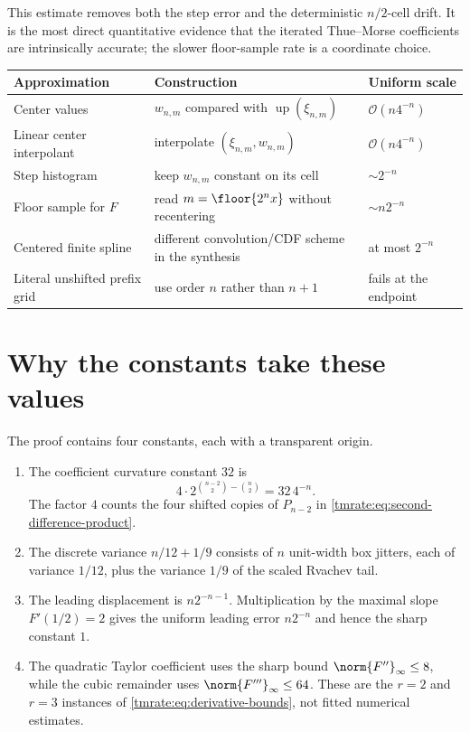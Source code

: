 \documentclass[11pt,oneside]{article}
\theoremstyle{definition}
\theoremstyle{remark}
\newcommand{\Up}{\operatorname{up}}
\newcommand{\bigO}{\mathcal O}
\begin{document}
This estimate removes both the step error and the deterministic $n/2$-cell
drift.  It is the most direct quantitative evidence that the iterated
Thue--Morse coefficients are intrinsically accurate; the slower floor-sample
rate is a coordinate choice.

\begin{center}
\begin{tabularx}{0.96\textwidth}{@{}l>{\raggedright\arraybackslash}Xl@{}}
\toprule
Approximation & Construction & Uniform scale\\
\midrule
Center values & $w_{n,m}$ compared with $\Up(\xi_{n,m})$ & $\bigO(n4^{-n})$\\
Linear center interpolant & interpolate $(\xi_{n,m},w_{n,m})$ & $\bigO(n4^{-n})$\\
Step histogram & keep $w_{n,m}$ constant on its cell & $\sim2^{-n}$\\
Floor sample for $F$ & read $m=\floor{2^n x}$ without recentering & $\sim n2^{-n}$\\
Centered finite spline & different convolution/CDF scheme in the synthesis & at most $2^{-n}$\\
Literal unshifted prefix grid & use order $n$ rather than $n+1$ & fails at the endpoint\\
\bottomrule
\end{tabularx}
\end{center}

\section{Why the constants take these values}
\label{tmrate:sec:constants}

The proof contains four constants, each with a transparent origin.

\begin{enumerate}
\item The coefficient curvature constant $32$ is
\begin{equation*}
 4\cdot 2^{\binom{n-2}{2}-\binom n2}=32\,4^{-n}.
\end{equation*}
The factor $4$ counts the four shifted copies of $P_{n-2}$ in
\eqref{tmrate:eq:second-difference-product}.

\item The discrete variance $n/12+1/9$ consists of $n$ unit-width box jitters,
each of variance $1/12$, plus the variance $1/9$ of the scaled Rvachev tail.

\item The leading displacement is $n2^{-n-1}$.  Multiplication by the maximal
slope $F'(1/2)=2$ gives the uniform leading error $n2^{-n}$ and hence the sharp
constant $1$.

\item The quadratic Taylor coefficient uses the sharp bound
$\norm{F''}_\infty\le8$, while the cubic remainder uses
$\norm{F'''}_\infty\le64$.  These are the $r=2$ and $r=3$ instances of
\eqref{tmrate:eq:derivative-bounds}, not fitted numerical estimates.
\end{enumerate}
\end{document}
